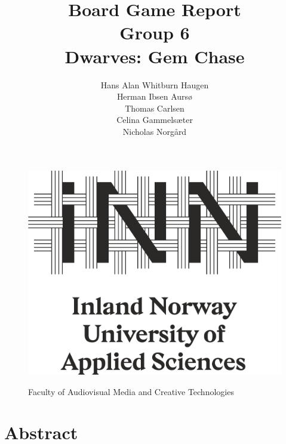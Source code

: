 \documentclass[12pt]{article}
\title{Board Game Report\\Group 6\\Dwarves: Gem Chase}
\author{Hans Alan Whitburn Haugen\\Herman Ibsen Aursø\\Thomas Carlsen\\Celina Gammelsæter\\Nicholas Norgård}
\begin{document}

\begin{figure}
\centering
\includegraphics[scale=0.5]{figures/logo}

Faculty of Audiovisual Media and Creative Technologies

\end{figure}

\maketitle

\section*{Abstract}

%
%
%
%
%
%
%
%
%
%
\end{document}
